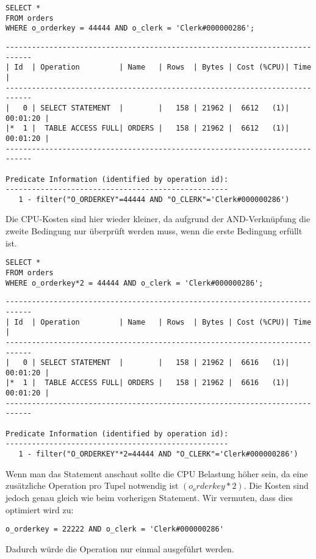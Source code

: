 \documentclass[10pt]{article}
\begin{document}
\begin{lstlisting}[style=sql]
SELECT *
FROM orders
WHERE o_orderkey = 44444 AND o_clerk = 'Clerk#000000286';
\end{lstlisting}
\begin{lstlisting}[style=queryexecutionplan]
----------------------------------------------------------------------------
| Id  | Operation         | Name   | Rows  | Bytes | Cost (%CPU)| Time     |
----------------------------------------------------------------------------
|   0 | SELECT STATEMENT  |        |   158 | 21962 |  6612   (1)| 00:01:20 |
|*  1 |  TABLE ACCESS FULL| ORDERS |   158 | 21962 |  6612   (1)| 00:01:20 |
----------------------------------------------------------------------------

Predicate Information (identified by operation id):
---------------------------------------------------
   1 - filter("O_ORDERKEY"=44444 AND "O_CLERK"='Clerk#000000286')
\end{lstlisting}
Die CPU-Kosten sind hier wieder kleiner, da aufgrund der AND-Verknüpfung die 
zweite Bedingung nur überprüft werden muss, wenn die erste Bedingung erfüllt ist.

\begin{lstlisting}[style=sql]
SELECT *
FROM orders
WHERE o_orderkey*2 = 44444 AND o_clerk = 'Clerk#000000286';
\end{lstlisting}
\begin{lstlisting}[style=queryexecutionplan]
----------------------------------------------------------------------------
| Id  | Operation         | Name   | Rows  | Bytes | Cost (%CPU)| Time     |
----------------------------------------------------------------------------
|   0 | SELECT STATEMENT  |        |   158 | 21962 |  6616   (1)| 00:01:20 |
|*  1 |  TABLE ACCESS FULL| ORDERS |   158 | 21962 |  6616   (1)| 00:01:20 |
----------------------------------------------------------------------------

Predicate Information (identified by operation id):
---------------------------------------------------
   1 - filter("O_ORDERKEY"*2=44444 AND "O_CLERK"='Clerk#000000286')
\end{lstlisting}
Wenn man das Statement anschaut sollte die CPU Belastung höher sein, da eine 
zusätzliche Operation pro Tupel notwendig ist $(o_orderkey * 2)$. Die Kosten 
sind jedoch genau gleich wie beim vorherigen Statement. Wir vermuten, dass 
dies optimiert wird zu:
\begin{lstlisting}[style=sql]
o_orderkey = 22222 AND o_clerk = 'Clerk#000000286'
\end{lstlisting}
Dadurch würde die Operation nur einmal ausgeführt werden.
\end{document}
